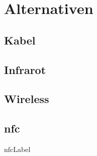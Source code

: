 \chapter{Alternativen}
\label{ch:alt}

\section{Kabel}

\section{Infrarot}

\section{Wireless}

\section{nfc}
\gls{nfcLabel}


